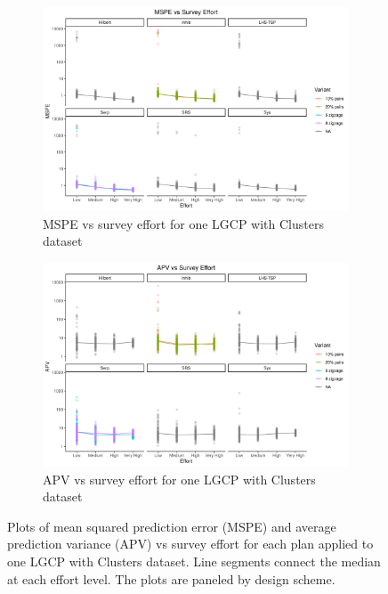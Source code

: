 \documentclass[review]{elsarticle}
\begin{document}
\begin{figure}

\begin{subfigure}{5in}
\includegraphics[width=5in]{../graphics/MSPE-effort-Cluster000004.png}
\caption{MSPE vs survey effort for one LGCP with Clusters dataset}
\label{mspeclust}
\end{subfigure}

\begin{subfigure}{5in}
\includegraphics[width=5in]{../graphics/APV-effort-Cluster000004.png}
\caption{APV vs survey effort for one LGCP with Clusters dataset}
\label{apvclust}
\end{subfigure}

\caption{Plots of mean squared prediction error (MSPE) and average prediction
variance (APV) vs survey effort for each plan applied to one LGCP with Clusters
dataset. Line segments connect the median at each effort level. The plots are
paneled by design scheme.}
\label{clustresults}
\end{figure}
\end{document}
